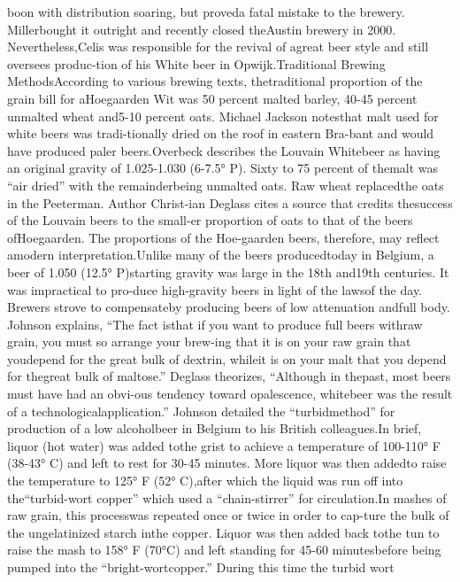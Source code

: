 \documentclass[a4paper,parskip=half]{scrartcl}
\begin{document}
boon with distribution soaring, but proveda fatal mistake to the brewery. Millerbought it outright and recently closed theAustin brewery in 2000. Nevertheless,Celis was responsible for the revival of agreat beer style and still oversees produc-tion of his White beer in Opwijk.Traditional Brewing MethodsAccording to various brewing texts, thetraditional proportion of the grain bill for aHoegaarden Wit was 50 percent malted
barley, 40-45 percent unmalted wheat and5-10 percent oats. Michael Jackson notesthat malt used for white beers was tradi-tionally dried on the roof in eastern Bra-bant and would have produced paler beers.Overbeck describes the Louvain Whitebeer as having an original gravity of 1.025-1.030 (6-7.5° P). Sixty to 75 percent of themalt was “air dried” with the remainderbeing unmalted oats. Raw wheat replacedthe oats in the Peeterman. Author Christ-ian Deglass cites a source that credits thesuccess of the Louvain beers to the small-er proportion of oats to that of the beers ofHoegaarden. The proportions of the Hoe-gaarden beers, therefore, may reflect amodern interpretation.Unlike many of the beers producedtoday in Belgium, a beer of 1.050 (12.5° P)starting gravity was large in the 18th and19th centuries. It was impractical to pro-duce high-gravity beers in light of the lawsof the day. Brewers strove to compensateby producing beers of low attenuation andfull body. Johnson explains, “The fact isthat if you want to produce full beers withraw grain, you must so arrange your brew-ing that it is on your raw grain that youdepend for the great bulk of dextrin, whileit is on your malt that you depend for thegreat bulk of maltose.” Deglass theorizes, “Although in thepast, most beers must have had an obvi-ous tendency toward opalescence, whitebeer was the result of a technologicalapplication.” Johnson detailed the “turbidmethod” for production of a low alcoholbeer in Belgium to his British colleagues.In brief, liquor (hot water) was added tothe grist to achieve a temperature of 100-110° F (38-43° C) and left to rest for 30-45 minutes. More liquor was then addedto raise the temperature to 125° F (52° C),after which the liquid was run off into the“turbid-wort copper” which used a “chain-stirrer” for circulation.In mashes of raw grain, this processwas repeated once or twice in order to cap-ture the bulk of the ungelatinized starch inthe copper. Liquor was then added back tothe tun to raise the mash to 158° F (70°C) and left standing for 45-60 minutesbefore being pumped into the “bright-wortcopper.” During this time the turbid wort
\end{document}
